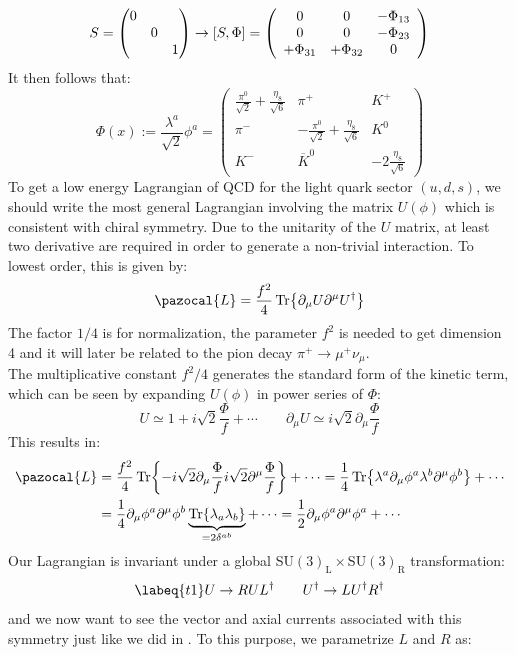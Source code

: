 \documentclass[../main.tex]{subfiles}
\begin{document}
\[
S=\mqty(\dmat{0,0,1})\to[S,\Phi]=\left(\begin{array}{ccc}
    0 & 0 & -\Phi_{13} \\
    0 & 0 & -\Phi_{23} \\
    +\Phi_{31} & +\Phi_{32} & 0
\end{array}\right)
\]
It then follows that:
\[
\Phi(x):=\frac{\lambda^a}{\sqrt{2}}\phi^a=\left(\begin{array}{ccc}
    \frac{\pi^0}{\sqrt{2}}+\frac{\eta_8}{\sqrt{6}} & \pi^+ & K^+ \\
    \pi^- & -\frac{\pi^0}{\sqrt{2}}+\frac{\eta_8}{\sqrt{6}} & K^0 \\
    K^- & \overline{K}^0 & -2\frac{\eta_8}{\sqrt{6}}
\end{array}\right)
\]
To get a low energy Lagrangian of QCD for the light quark sector $(u, d, s)$, we should write the most general Lagrangian involving the matrix $U(\phi)$ which is consistent with chiral symmetry. Due to the unitarity of the $U$ matrix, at least two derivative are required in order to generate a non-trivial interaction. To lowest order, this is given by:
\[
\pazocal{L}=\frac{f^2}{4}\Tr{\partial_\mu U\partial^\mu U^\dagger}
\]
The factor $1/4$ is for normalization, the parameter $f^2$ is needed to get dimension 4 and it will later be related to the pion decay $\pi^+\to\mu^+\nu_\mu$.\\
The multiplicative constant $f^2/4$ generates the standard form of the kinetic term, which can be seen by expanding $U(\phi)$ in power series of $\Phi$:
\[
U\simeq1+i\sqrt{2}\frac{\Phi}{f}+\cdots \qquad \partial_\mu U\simeq i\sqrt{2}\partial_\mu\frac{\Phi}{f}
\]
This results in:
\[
\begin{aligned}
\pazocal{L}&=\frac{f^2}{4}\Tr{-i\sqrt{2}\partial_\mu\frac{\Phi}{f}i\sqrt{2}\partial^\mu\frac{\Phi}{f}}+\cdots=\frac{1}{4}\Tr{\lambda^a\partial_\mu\phi^a\lambda^b\partial^\mu\phi^b}+\cdots\\
&=\frac{1}{4}\partial_\mu\phi^a\partial^\mu\phi^b\underbrace{\Tr{\lambda_a\lambda_b}}_{=2\delta^{ab}}+\cdots=\frac{1}{2}\partial_\mu\phi^a\partial^\mu\phi^a+\cdots
\end{aligned}
\]
Our Lagrangian is invariant under a global SU$(3)_{\text{L}}\times$SU$(3)_{\text{R}}$ transformation:
\begin{equation}
\labeq{t1}
U\to RUL^\dagger \qquad U^\dagger\to LU^\dagger R^\dagger
\end{equation}
and we now want to see the vector and axial currents associated with this symmetry just like we did in . To this purpose, we parametrize $L$ and $R$ as:
\end{document}

